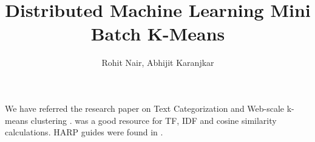 \documentclass[a4paper,10pt]{article}
\title{Distributed Machine Learning Mini Batch K-Means}
\author{Rohit Nair, Abhijit Karanjkar}
\begin{document}
\maketitle

We have referred the research paper on Text Categorization \cite{RCV1} and Web-scale k-means clustering \cite{Sculley}. \cite{TFIDF} was a good resource for TF, IDF and cosine similarity calculations. HARP guides were found in \cite{HARP}.

\medskip


\end{document}
